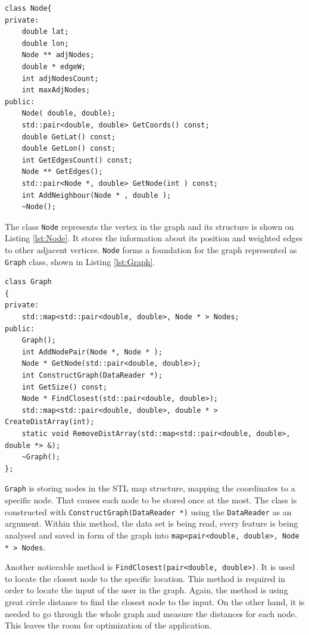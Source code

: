 \documentclass[thesis=M,english]{FITthesis}[2012/10/20]
\begin{document}
\begin{lstlisting}[frame=single, caption={\texttt{Node} class}, label={lst:Node}]
class Node{
private:
    double lat;
    double lon;
    Node ** adjNodes;
    double * edgeW;
    int adjNodesCount;
    int maxAdjNodes;
public:
    Node( double, double);
    std::pair<double, double> GetCoords() const;
    double GetLat() const;
    double GetLon() const;
    int GetEdgesCount() const;
    Node ** GetEdges();
    std::pair<Node *, double> GetNode(int ) const; 
	int AddNeighbour(Node * , double );
    ~Node();
\end{lstlisting}

The class \texttt{Node} represents the vertex in the graph and its structure is shown on Listing \ref{lst:Node}. It stores the information about its position and weighted edges to other adjacent vertices. \texttt{Node} forms a foundation for the graph represented as \texttt{Graph} class, shown in Listing \ref{lst:Graph}.

\begin{lstlisting}[frame=single, caption={\texttt{Graph} class}, label={lst:Graph}, breaklines=true]
class Graph
{
private:
    std::map<std::pair<double, double>, Node * > Nodes;
public:
    Graph();
    int AddNodePair(Node *, Node * );
    Node * GetNode(std::pair<double, double>);
    int ConstructGraph(DataReader *);
    int GetSize() const;
    Node * FindClosest(std::pair<double, double>);
    std::map<std::pair<double, double>, double * > CreateDistArray(int);
    static void RemoveDistArray(std::map<std::pair<double, double>, double *> &);
    ~Graph();
};
\end{lstlisting}

\texttt{Graph} is storing nodes in the STL map structure, mapping the coordinates to a specific node. That causes each node to be stored once at the most. The class is constructed with \texttt{ConstructGraph(DataReader *)} using the \texttt{DataReader} as an argument. Within this method, the data set is being read, every feature is being analysed and saved in form of the graph into \texttt{map<pair<double, double>, Node * > Nodes}.

Another noticeable method is \texttt{FindClosest(pair<double, double>)}. It is used to locate the closest node to the specific location. This method is required in order to locate the input of the user in the graph. Again, the method is using great circle distance to find the closest node to the input. 
On the other hand, it is needed to go through the whole graph and measure the distances for each node. 
This leaves the room for optimization of the application.
\end{document}
